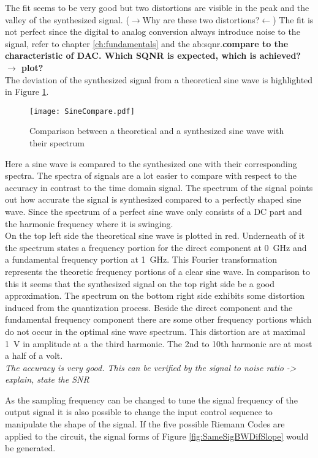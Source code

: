 The fit seems to be very good but two distortions are visible in the peak and the valley of the synthesized signal.
($\rightarrow$Why are these two distortions?$\leftarrow$)
The fit is not perfect since the digital to analog conversion always introduce noise to the signal, refer to chapter \ref{ch:fundamentals} and the \gls{ab:sqnr}.\textbf{compare to the characteristic of DAC. Which SQNR is expected, which is achieved? $\rightarrow$ plot?} \\
The deviation of the synthesized signal from a theoretical sine wave is highlighted in Figure \ref{fig:SineCompare}.

\begin{figure}[htb!]
	\centering
  \texttt{[image: SineCompare.pdf]}
	\caption{Comparison between a theoretical and a synthesized sine wave with their spectrum}
	\label{fig:SineCompare}
\end{figure}

Here a sine wave is compared to the synthesized one with their corresponding spectra.
The spectra of signals are a lot easier to compare with respect to the accuracy in contrast to the time domain signal.
The spectrum of the signal points out how accurate the signal is synthesized compared to a perfectly shaped sine wave. 
Since the spectrum of a perfect sine wave only consists of a DC part and the harmonic frequency where it is swinging.\\
On the top left side the theoretical sine wave is plotted in red. Underneath of it the spectrum states a frequency portion for the direct component at \SI{0} {\GHz} and a fundamental frequency portion at \SI{1}{\GHz}.
This Fourier transformation represents the theoretic frequency portions of a clear sine wave. 
In comparison to this it seems that the synthesized signal on the top right side be a good approximation.
The spectrum on the bottom right side exhibits some distortion induced from the quantization process. 
Beside the direct component and the fundamental frequency component there are some other frequency portions which do not occur in the optimal sine wave spectrum.
This distortion are at maximal \SI{1}{\volt} in amplitude at a the third harmonic. The 2nd to 10th harmonic are at most a half of a volt. \\
\textit{The accuracy is very good. This can be verified by the signal to noise ratio -> explain, state the SNR}


As the sampling frequency can be changed to tune the signal frequency of the output signal it is also possible to change the input control sequence to manipulate the shape of the signal.
If the five possible Riemann Codes are applied to the circuit, the signal forms of Figure \ref{fig:SameSigBWDifSlope} would be generated.

